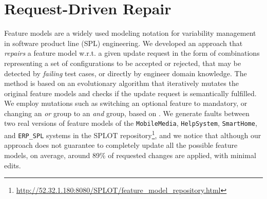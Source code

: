 \documentclass[
11pt, %
oneside, %
english, %
singlespacing, %
headsepline, %
]{MastersDoctoralThesis} %
\theoremstyle{plain}
\theoremstyle{definition}
\theoremstyle{remark}
\theoremstyle{remark}
\theoremstyle{plain}
\theoremstyle{plain}
\begin{document}



\chapter{Request-Driven Repair}
Feature models are a widely used modeling notation for variability management in software product line (SPL) engineering. 
We developed an approach that \textit{repairs} a feature model w.r.t. a given update request in the form of combinations representing a set of configurations to be accepted or rejected, that may be detected by \textit{failing} test cases, or directly by engineer domain knowledge. %
The method is based on an evolutionary algorithm that iteratively mutates the original feature models and checks if the update request is semantically fulfilled.
We employ mutations such as switching an optional feature to mandatory, or changing an \emph{or} group to an \emph{and} group, based on \cite{arcaini2018evolutionary}.
We generate faults between two real versions of feature models of the {\tt MobileMedia}, {\tt HelpSystem},  {\tt SmartHome}, and {\tt ERP\_SPL} systems in the SPLOT repository\footnote{\url{http://52.32.1.180:8080/SPLOT/feature_model_repository.html}}, and we notice that although our approach does not guarantee to completely update all the possible feature models, on average, around 89\% of requested changes are applied, with minimal edits.%
\end{document}

